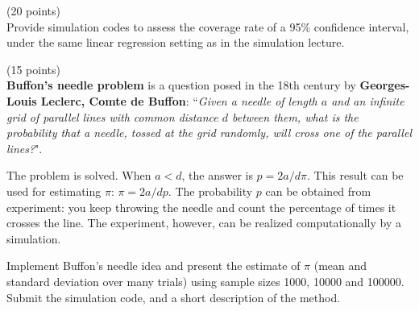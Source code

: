 \documentclass[11pt]{article}
\begin{document}
\vspace{0.2in}
 (20 points) \\
Provide simulation codes to assess the coverage rate of a 95\% confidence interval,
under the same linear regression setting as in the simulation lecture.  

\vspace{0.2in}
 (15 points) \\
{\bf Buffon's needle problem} is a question posed  in the 18th century by 
{\bf Georges-Louis Leclerc, Comte de Buffon}:
``{\it Given a needle of length $a$ and an infinite grid of parallel lines with common distance $d$ between them, 
what is the probability that a needle, tossed at the grid randomly, will cross one of the parallel lines?}".

The problem is solved. When $a < d$, the answer is $p=2a/d\pi$. This result can be used for estimating $\pi$:
$\pi = 2a/dp$. The probability $p$ can be obtained from experiment: you keep throwing the needle 
and count the percentage of times it crosses the line. The experiment, however, can be realized computationally
by a simulation. 

Implement Buffon's needle idea 
and present the estimate of $\pi$ (mean and standard deviation over many trials) 
using sample sizes 1000, 10000 and 100000.
Submit the simulation code, and a short description of the method.
\end{document}
